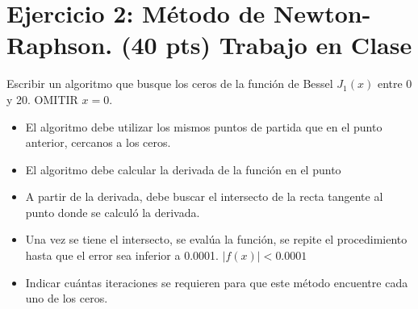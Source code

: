 \documentclass{article}
\begin{document}
\section{Ejercicio 2: Método de Newton-Raphson. (40 pts) Trabajo en Clase}

Escribir un algoritmo que busque los ceros de la función de Bessel
$J_1(x)$ entre 0 y 20. OMITIR $x=0$.

\begin{itemize}
\item El algoritmo debe utilizar los mismos puntos de partida que en el
  punto anterior, cercanos a los ceros.
\item El algoritmo debe calcular la derivada de la función en el punto
\item A partir de la derivada, debe buscar el intersecto de la recta tangente
  al punto donde se calculó la derivada.
\item Una vez se tiene el intersecto, se evalúa la función, se repite el
  procedimiento hasta que el error sea inferior a 0.0001.
  $|f(x)| < 0.0001$
\item Indicar cuántas iteraciones se requieren para que este método
  encuentre cada uno de los ceros.
\end{itemize}
\end{document}
